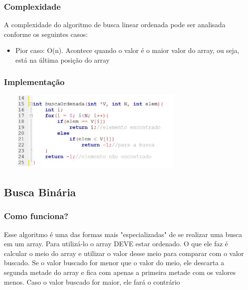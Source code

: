 \documentclass{report}
\begin{document}
	\subsubsection{Complexidade}
	
	A complexidade do algoritmo de busca linear ordenada pode ser analisada conforme os seguintes casos:
	
	\begin{itemize}
		\item Pior caso: O(n). Acontece quando o valor é o maior valor do array, ou seja, está na última posição do array
	\end{itemize}
	
	\subsubsection{Implementação}
	
	\begin{center}
		
		\includegraphics[width=10cm,height=4cm,keepaspectratio=false]{imagens/blinearordenadafuncionamento.png}
		
	\end{center}
	
	\subsection{Busca Binária}
	
	\subsubsection{Como funciona?}
	
	Esse algoritmo é uma das formas mais "especializadas" de se realizar uma busca em um array. Para utilizá-lo o array DEVE estar ordenado. O que ele faz é calcular o meio do array e utilizar o valor desse meio para comparar com o valor buscado. Se o valor buscado for menor que o valor do meio, ele descarta a segunda metade do array e fica com apenas a primeira metade com os valores menos. Caso o valor buscado for maior, ele fará o contrário
	
\end{document}
